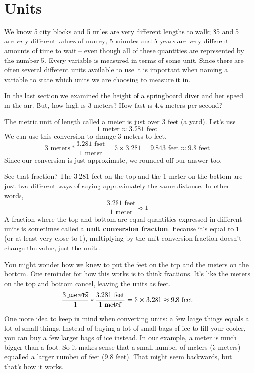 ~\vspace{.1in}

\section{Units}

We know 5 city blocks and 5 miles are very different lengths to walk; \$5 and 5\textcent \hspace{.01in} are very different values of money; 5 minutes and 5 years are very different amounts of time to wait -- even though all of these quantities are represented by the number 5. Every variable is measured in terms of some unit.  Since there are often several different units available to use it is important when naming a variable to state which units we are choosing to measure it in.  

In the last section we examined the height of a springboard diver and her speed in the air.  But, how high is 3 meters?  How fast is 4.4 meters per second?  

The metric unit of length called a meter is just over 3 feet (a yard).  Let's use 
$$1 \text{ meter} \approx 3.281 \text{ feet}$$  
We can use this conversion to change 3 meters to feet.
$$3 \text{ meters} \ast  \frac{3.281 \text{ feet}}{1 \text{ meter}} = 3 \times 3.281 = 9.843 \text{ feet} \approx 9.8 \text{ feet}$$  
Since our conversion is just approximate, we rounded off our answer too. 

See that fraction?  The 3.281 feet on the top and the 1 meter on the bottom are just two different ways of saying approximately the same distance. In other words, 
$$\frac{3.281 \text{ feet}}{1 \text{ meter}} \approx 1$$ 
 A fraction where the top and bottom are equal quantities expressed in different units is sometimes called a \textbf{unit conversion fraction}.  Because it's equal to 1 (or at least very close to 1), multiplying by the unit conversion fraction doesn't change the value, just the units.

You might wonder how we knew to put the feet on the top and the meters on the bottom.  One reminder for how this works is to think fractions.  It's like the meters on the top and bottom cancel, leaving the units as feet.  
$$\frac{3 \text{ \cancel{meters}}}{1} \ast  \frac{3.281 \text{ feet}}{1 \text{ \cancel{meter}}} = 3 \times 3.281 \approx 9.8 \text{ feet}$$

One more idea to keep in mind when converting units:  a few large things equals a lot of small things.  
Instead of buying a lot of small bags of ice to fill your cooler, you can buy a few larger  bags of ice instead. 
In our example, a meter is much bigger than a foot.  So it makes sense that a small number of meters (3 meters) equalled a larger number of feet (9.8 feet).  That might seem backwards, but that's how it works.  

